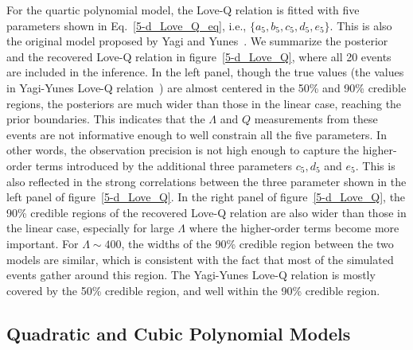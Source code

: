 \documentclass[a4paper,11pt]{article}
\begin{document}
For the quartic polynomial model, the Love-Q relation is fitted with five 
parameters shown in Eq.~\eqref{5-d_Love_Q_eq}, i.e., $\{a_5, b_5, c_5, d_5, e_5\}$. 
This is also the original model proposed by Yagi and Yunes~\cite{Yagi:2013awa}. We 
summarize the posterior and the recovered Love-Q relation in figure~\ref{5-d_Love_Q}, where
all 20 events are included in the inference. In the left panel, though the true 
values (the values in Yagi-Yunes Love-Q relation~\cite{Yagi:2013awa}) are almost 
centered in the 50\% and 90\% credible regions, the posteriors are much wider than 
those in the linear case, reaching the prior boundaries. This indicates that the $\Lambda$ and $Q$ measurements
from these events are not informative enough to well constrain all the five 
parameters. In other words, the observation precision is not high enough to 
capture the higher-order terms introduced by the additional three parameters
$c_5, d_5$ and $e_5$. This is also reflected in the strong correlations between 
the three parameter shown in the left panel of figure~\ref{5-d_Love_Q}. In the 
right panel of figure~\ref{5-d_Love_Q}, the 90\% credible regions of the
recovered Love-Q relation are also wider than those in the linear case, especially 
for large $\Lambda$ where the higher-order terms become more important. For 
$\Lambda \sim 400$, the widths of the 90\% credible region between
the two models are similar, which is consistent with the fact that most of the 
simulated events gather around this region. The Yagi-Yunes Love-Q relation is 
mostly covered by the 50\% credible region, and well within the 90\% credible region.

\subsection{Quadratic and Cubic Polynomial Models}
\label{subsec:results_quadratic_cubic}
\end{document}
